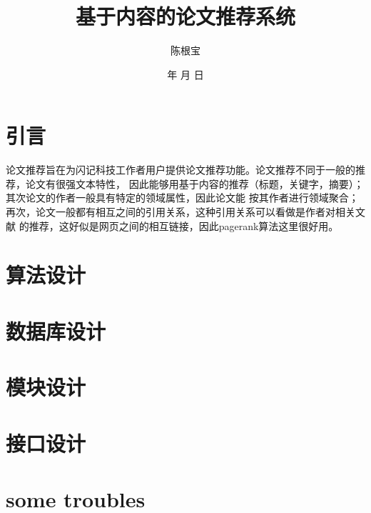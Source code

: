 \documentclass[a4paper]{article}
\begin{document}
\renewcommand{\today}{\number\year 年 \number\month 月 \number\day 日}
\renewcommand{\contentsname}{目 \quad 录}
\title{基于内容的论文推荐系统}
\author{陈根宝}
\date{\today}
\maketitle
\newpage
\tableofcontents
\newpage
\section{引言}
论文推荐旨在为闪记科技工作者用户提供论文推荐功能。论文推荐不同于一般的推荐，论文有很强文本特性，%
因此能够用基于内容的推荐（标题，关键字，摘要）；其次论文的作者一般具有特定的领域属性，因此论文能%
按其作者进行领域聚合；再次，论文一般都有相互之间的引用关系，这种引用关系可以看做是作者对相关文献%
的推荐，这好似是网页之间的相互链接，因此pagerank算法这里很好用。
\section{算法设计}

\section{数据库设计}
\section{模块设计}
\section{接口设计}
\section{some troubles}
\end{document}
